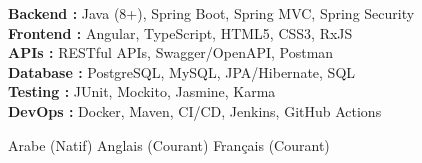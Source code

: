 \documentclass[11pt,a4paper]{article}
\begin{document}
{\small
\textbf{Backend :} Java (8+), Spring Boot, Spring MVC, Spring Security\\[1.5pt]
\textbf{Frontend :} Angular, TypeScript, HTML5, CSS3, RxJS\\[1.5pt]
\textbf{APIs :} RESTful APIs, Swagger/OpenAPI, Postman\\[1.5pt]
\textbf{Database :} PostgreSQL, MySQL, JPA/Hibernate, SQL\\[1.5pt]
\textbf{Testing :} JUnit, Mockito, Jasmine, Karma\\[1.5pt]
\textbf{DevOps :} Docker, Maven, CI/CD, Jenkins, GitHub Actions
}

Arabe (Natif) \textbar{} Anglais (Courant) \textbar{} Français (Courant)

\end{document}
